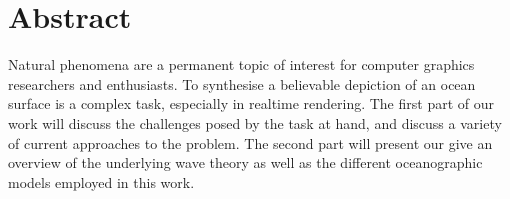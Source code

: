 \chapter*{Abstract}


Natural phenomena are a permanent topic of interest for computer graphics researchers and enthusiasts. To synthesise a believable
depiction of an ocean surface is a complex task, especially in realtime rendering. The first part of our work will discuss the
challenges posed by the task at hand, and discuss a variety of current approaches to the problem. The second part will present
our give an
overview of the underlying wave theory as well as the different oceanographic models employed in this work.